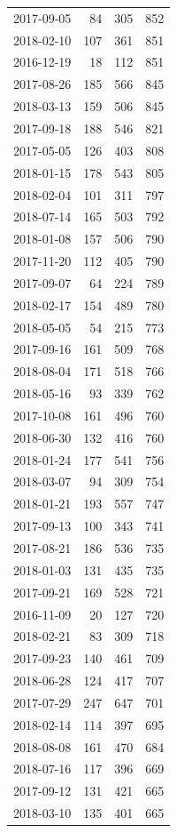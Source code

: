 \begin{tabular}{lrrr}
2017-09-05 & 84 & 305 & 852 \\
2018-02-10 & 107 & 361 & 851 \\
2016-12-19 & 18 & 112 & 851 \\
2017-08-26 & 185 & 566 & 845 \\
2018-03-13 & 159 & 506 & 845 \\
2017-09-18 & 188 & 546 & 821 \\
2017-05-05 & 126 & 403 & 808 \\
2018-01-15 & 178 & 543 & 805 \\
2018-02-04 & 101 & 311 & 797 \\
2018-07-14 & 165 & 503 & 792 \\
2018-01-08 & 157 & 506 & 790 \\
2017-11-20 & 112 & 405 & 790 \\
2017-09-07 & 64 & 224 & 789 \\
2018-02-17 & 154 & 489 & 780 \\
2018-05-05 & 54 & 215 & 773 \\
2017-09-16 & 161 & 509 & 768 \\
2018-08-04 & 171 & 518 & 766 \\
2018-05-16 & 93 & 339 & 762 \\
2017-10-08 & 161 & 496 & 760 \\
2018-06-30 & 132 & 416 & 760 \\
2018-01-24 & 177 & 541 & 756 \\
2018-03-07 & 94 & 309 & 754 \\
2018-01-21 & 193 & 557 & 747 \\
2017-09-13 & 100 & 343 & 741 \\
2017-08-21 & 186 & 536 & 735 \\
2018-01-03 & 131 & 435 & 735 \\
2017-09-21 & 169 & 528 & 721 \\
2016-11-09 & 20 & 127 & 720 \\
2018-02-21 & 83 & 309 & 718 \\
2017-09-23 & 140 & 461 & 709 \\
2018-06-28 & 124 & 417 & 707 \\
2017-07-29 & 247 & 647 & 701 \\
2018-02-14 & 114 & 397 & 695 \\
2018-08-08 & 161 & 470 & 684 \\
2018-07-16 & 117 & 396 & 669 \\
2017-09-12 & 131 & 421 & 665 \\
2018-03-10 & 135 & 401 & 665 \\

\end{tabular}
